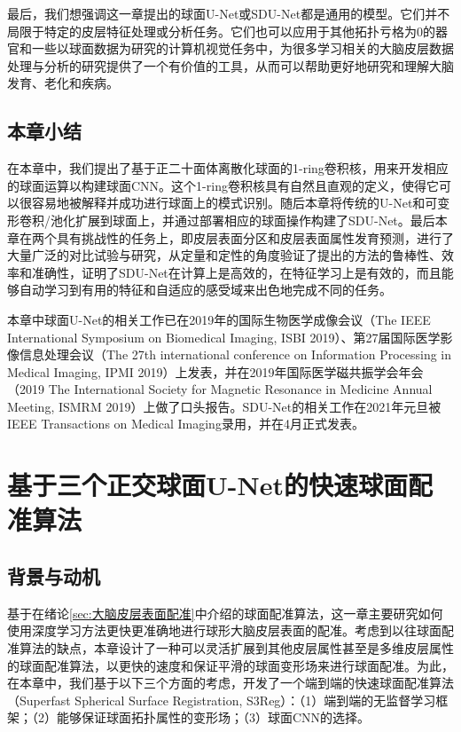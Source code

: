 最后，我们想强调这一章提出的球面U-Net或SDU-Net都是通用的模型。它们并不局限于特定的皮层特征处理或分析任务。它们也可以应用于其他拓扑亏格为0的器官和一些以球面数据为研究的计算机视觉任务中，为很多学习相关的大脑皮层数据处理与分析的研究提供了一个有价值的工具，从而可以帮助更好地研究和理解大脑发育、老化和疾病。

\section{本章小结}
在本章中，我们提出了基于正二十面体离散化球面的1-ring卷积核，用来开发相应的球面运算以构建球面CNN。这个1-ring卷积核具有自然且直观的定义，使得它可以很容易地被解释并成功进行球面上的模式识别。随后本章将传统的U-Net和可变形卷积/池化扩展到球面上，并通过部署相应的球面操作构建了SDU-Net。最后本章在两个具有挑战性的任务上，即皮层表面分区和皮层表面属性发育预测，进行了大量广泛的对比试验与研究，从定量和定性的角度验证了提出的方法的鲁棒性、效率和准确性，证明了SDU-Net在计算上是高效的，在特征学习上是有效的，而且能够自动学习到有用的特征和自适应的感受域来出色地完成不同的任务。

%
        {
        }
        {
        本章中球面U-Net的相关工作已在2019年的国际生物医学成像会议（The IEEE International Symposium on Biomedical Imaging, ISBI 2019）、第27届国际医学影像信息处理会议（The 27th international conference on Information Processing in Medical Imaging, IPMI 2019）上发表，并在2019年国际医学磁共振学会年会（2019 The International Society for Magnetic Resonance in Medicine Annual Meeting, ISMRM 2019）上做了口头报告。SDU-Net的相关工作在2021年元旦被IEEE Transactions on Medical Imaging录用，并在4月正式发表。
        }








\chapter{基于三个正交球面U-Net的快速球面配准算法}\label{sec:基于三个正交球面U-Net的快速球面配准算法}

\section{背景与动机}
基于在绪论\ref{sec:大脑皮层表面配准}中介绍的球面配准算法，这一章主要研究如何使用深度学习方法更快更准确地进行球形大脑皮层表面的配准。考虑到以往球面配准算法的缺点，本章设计了一种可以灵活扩展到其他皮层属性甚至是多维皮层属性的球面配准算法，以更快的速度和保证平滑的球面变形场来进行球面配准。为此，在本章中，我们基于以下三个方面的考虑，开发了一个端到端的快速球面配准算法（Superfast Spherical Surface Registration, S3Reg）：（1）端到端的无监督学习框架；（2）能够保证球面拓扑属性的变形场；（3）球面CNN的选择。

